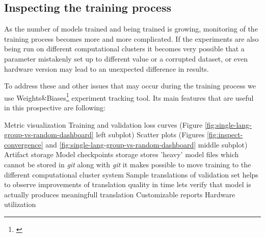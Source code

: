 \subsection{Inspecting the training process}

As the number of models trained and being trained is growing, monitoring of the training
process becomes more and more complicated. If the experiments are also being run on different
computational clusters it becomes very possible that a parameter mistakenly set up to different
value or a corrupted dataset, or even hardware version may lead to an unexpected difference in results.

To address these and other issues that may occur during the training process we use
Weights$\&$Biases\footnote{\cite{wandb}} experiment tracking tool.
Its main features that are useful in this prospective are following:
\begin{outline}
	\1 Metric visualization
		\2 Training and validation loss curves
		(Figure \ref{fig:single-lang-group-vs-random-dashboard} left subplot)
		\2 Scatter plots (Figures \ref{fig:inspect-convergence}
		and \ref{fig:single-lang-group-vs-random-dashboard} middle subplot)
	\1 Artifact storage
		\2 Model checkpoints storage
			\3 stores 'heavy' model files which cannot be stored
			in \emph{git}
			\3 along with \emph{git} it makes possible to move training
			to the different computational cluster system
		\2 Sample translations of validation set
			\3 helps to observe improvements of translation quality
			in time
			\3 lets verify that model is actually produces meaningfull
			translation
	\1 Customizable reports
	\1 Hardware utilization
\end{outline}

